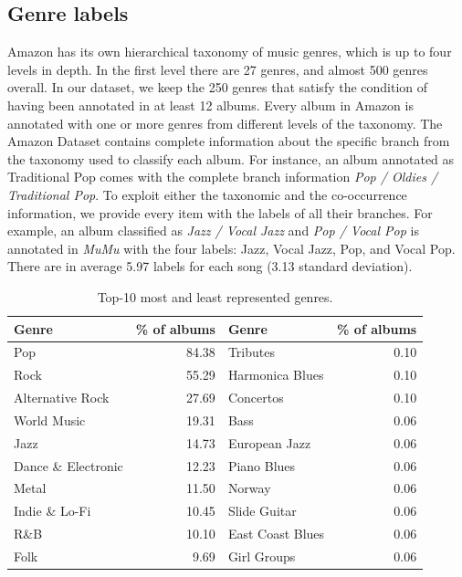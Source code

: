 \subsection{Genre labels}\label{sec:multi-class:taxonomy}

Amazon has its own hierarchical taxonomy of music genres, which is up to four levels in depth.
In the first level there are 27 genres, and almost 500 genres overall. 
In our dataset, we keep the 250 genres that satisfy the condition of having been annotated in at least 12 albums. %
Every album in Amazon is annotated with one or more genres from different levels of the taxonomy. 
The Amazon Dataset contains complete information about the specific branch from the taxonomy used to classify each album. For instance, an album annotated as Traditional Pop comes with the complete branch information \textit{Pop / Oldies / Traditional Pop}. 
To exploit either the taxonomic and the co-occurrence information, we provide every item with the labels of all their branches. For example, an album classified as \textit{Jazz / Vocal Jazz} and \textit{Pop / Vocal Pop} is annotated in \emph{MuMu} with the four labels: Jazz, Vocal Jazz, Pop, and Vocal Pop. There are in average 5.97 labels for each song (3.13 standard deviation).

\begin{table}
\centering
\scriptsize
\label{tbl:genres}
\begin{tabular}{lr|lr}
\toprule
Genre & \% of albums & Genre & \% of albums \\
\midrule
Pop & 84.38 & Tributes & 0.10 \\
Rock & 55.29 & Harmonica Blues & 0.10 \\
Alternative Rock & 27.69 & Concertos & 0.10 \\
World Music & 19.31 & Bass & 0.06 \\
Jazz & 14.73 & European Jazz & 0.06 \\
Dance \& Electronic & 12.23 & Piano Blues & 0.06 \\
Metal & 11.50 & Norway & 0.06 \\
Indie \& Lo-Fi & 10.45 & Slide Guitar & 0.06 \\
R\&B & 10.10& East Coast Blues & 0.06 \\
Folk & 9.69 & Girl Groups & 0.06 \\
\bottomrule
\end{tabular}
\caption{Top-10 most and least represented genres.}
\end{table}

